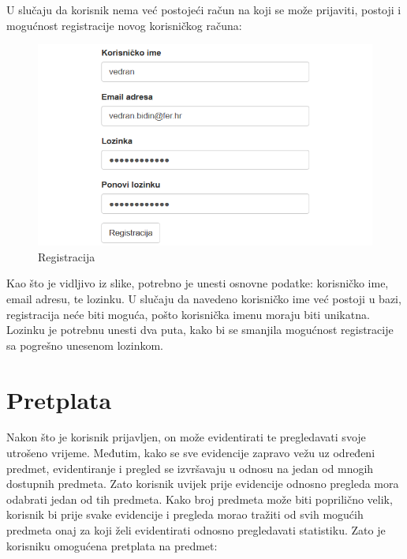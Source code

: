 \documentclass[times, utf8, zavrsni]{fer}
\begin{document}
U slučaju da korisnik nema već postojeći račun na koji se može prijaviti, postoji i mogućnost registracije novog korisničkog računa:\\

\begin{figure}[H]
\centering
\includegraphics[width=\textwidth,height=\textheight,keepaspectratio]{img/registracija.png}
\caption{Registracija}
\label{fig:registracija}
\end{figure}

Kao što je vidljivo iz slike, potrebno je unesti osnovne podatke: korisničko ime, email adresu, te lozinku. U slučaju da navedeno korisničko ime već postoji u bazi, registracija neće biti moguća, pošto korisnička imenu moraju biti unikatna. Lozinku je potrebnu unesti dva puta, kako bi se smanjila mogućnost registracije sa pogrešno unesenom lozinkom.

\section{Pretplata}
Nakon što je korisnik prijavljen, on može evidentirati te pregledavati svoje utrošeno vrijeme. Međutim, kako se sve evidencije zapravo vežu uz određeni predmet, evidentiranje i pregled se izvršavaju u odnosu na jedan od mnogih dostupnih predmeta. Zato korisnik uvijek prije evidencije odnosno pregleda mora odabrati jedan od tih predmeta. Kako broj predmeta može biti poprilično velik, korisnik bi prije svake evidencije i pregleda morao tražiti od svih mogućih predmeta onaj za koji želi evidentirati odnosno pregledavati statistiku. Zato je korisniku omogućena pretplata na predmet:\\
\end{document}
